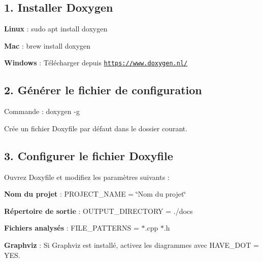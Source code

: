 \subsection*{1. Installer Doxygen}


\begin{DoxyItemize}
\item {\bfseries Linux} \+: {\ttfamily sudo apt install doxygen}
\item {\bfseries Mac} \+: {\ttfamily brew install doxygen}
\item {\bfseries Windows} \+: Télécharger depuis \href{https://www.doxygen.nl/}{\tt https\+://www.\+doxygen.\+nl/}
\end{DoxyItemize}

\subsection*{2. Générer le fichier de configuration}


\begin{DoxyItemize}
\item Commande \+: {\ttfamily doxygen -\/g}
\item Crée un fichier {\ttfamily Doxyfile} par défaut dans le dossier courant.
\end{DoxyItemize}

\subsection*{3. Configurer le fichier {\ttfamily Doxyfile}}


\begin{DoxyItemize}
\item Ouvrez {\ttfamily Doxyfile} et modifiez les paramètres suivants \+:
\begin{DoxyItemize}
\item {\bfseries Nom du projet} \+: {\ttfamily P\+R\+O\+J\+E\+C\+T\+\_\+\+N\+A\+ME = \char`\"{}\+Nom du projet\char`\"{}}
\item {\bfseries Répertoire de sortie} \+: {\ttfamily O\+U\+T\+P\+U\+T\+\_\+\+D\+I\+R\+E\+C\+T\+O\+RY = ./docs}
\item {\bfseries Fichiers analysés} \+: {\ttfamily F\+I\+L\+E\+\_\+\+P\+A\+T\+T\+E\+R\+NS = $\ast$.cpp $\ast$.h}
\item {\bfseries Graphviz} \+: Si Graphviz est installé, activez les diagrammes avec {\ttfamily H\+A\+V\+E\+\_\+\+D\+OT = Y\+ES}.
\end{DoxyItemize}
\end{DoxyItemize}

